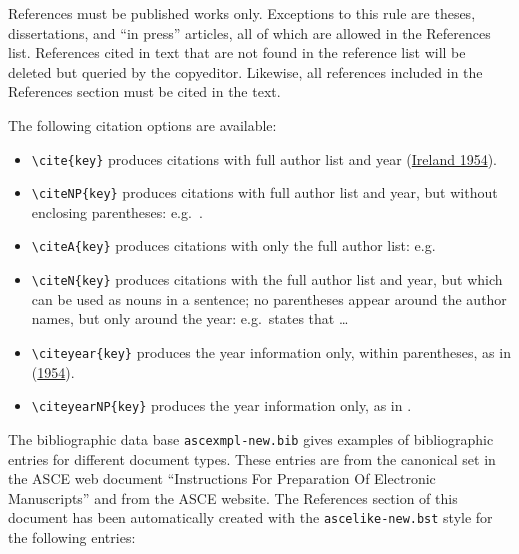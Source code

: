 \documentclass[
  NewProceedings,
  letterpaper]{./assets/ascelike-new}
\begin{document}
References must be published works only. Exceptions to this rule are
theses, dissertations, and ``in press'' articles, all of which are
allowed in the References list. References cited in text that are not
found in the reference list will be deleted but queried by the
copyeditor. Likewise, all references included in the References section
must be cited in the text.

The following citation options are available:

\begin{itemize}
\item
  \texttt{\textbackslash{}cite\{key\}} produces citations with full
  author list and year (\protect\hyperlink{ref-Ireland:1954a}{Ireland
  1954}).
\item
  \texttt{\textbackslash{}citeNP\{key\}} produces citations with full
  author list and year, but without enclosing parentheses: e.g.~.
\item
  \texttt{\textbackslash{}citeA\{key\}} produces citations with only the
  full author list: e.g.
\item
  \texttt{\textbackslash{}citeN\{key\}} produces citations with the full
  author list and year, but which can be used as nouns in a sentence; no
  parentheses appear around the author names, but only around the year:
  e.g.~states that \ldots{}
\item
  \texttt{\textbackslash{}citeyear\{key\}} produces the year information
  only, within parentheses, as in
  (\protect\hyperlink{ref-Ireland:1954a}{1954}).
\item
  \texttt{\textbackslash{}citeyearNP\{key\}} produces the year
  information only, as in .
\end{itemize}

The bibliographic data base \texttt{ascexmpl-new.bib} gives examples of
bibliographic entries for different document types. These entries are
from the canonical set in the ASCE web document ``Instructions For
Preparation Of Electronic Manuscripts'' and from the ASCE website. The
References section of this document has been automatically created with
the \texttt{ascelike-new.bst} style for the following entries:
\end{document}
